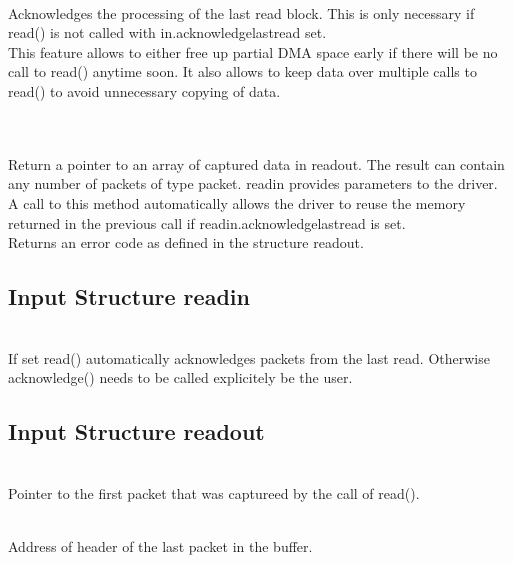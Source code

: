  \\
Acknowledges the processing of the last read block. This is only necessary if \textsf{\prefix read()} is not called with 
\textsf{in.acknowledge\tu last\tu read} set.\\
This feature allows to either free up partial DMA space early if there will be no call to \textsf{\prefix read()} anytime soon. 
It also allows to keep data over multiple calls to \textsf{\prefix read()} to avoid unnecessary copying of data. \par

  \\ \\
Return a pointer to an array of captured data in \textsf{read\tu out}. 
The result can contain any number of packets of type \textsf{\prefix packet}.
\textsf{read\tu in} provides parameters to the driver. 
A call to this method automatically allows the driver to reuse the memory returned in the previous call if \textsf{read\tu in.acknowledge\tu last\tu read} is set.\\
Returns an error code as defined in the structure \textsf{\prefix read\tu out}.

\subsection{Input Structure \prefix read\tu in}

	\\
	If set \textsf{\prefix read()} automatically acknowledges packets from the last read. 
	Otherwise \textsf{\prefix acknowledge()} needs to be called explicitely be the user. 

\subsection{Input Structure \prefix read\tu out}
	\\
	Pointer to the first packet that was captureed by the call of \textsf{\prefix read()}.\par

	\\
	Address of header of the last packet in the buffer.\par

